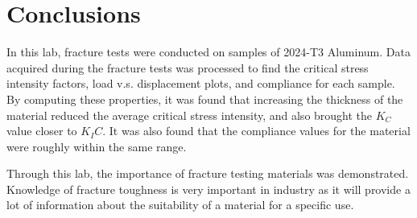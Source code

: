 \section{Conclusions}

In this lab, fracture tests were conducted on samples of 2024-T3 Aluminum. Data acquired during the fracture tests was processed to find the critical stress intensity factors, load v.s. displacement plots, and compliance for each sample. By computing these properties, it was found that increasing the thickness of the material reduced the average critical stress intensity, and also brought the $K_C$ value closer to $K_IC$. It was also found that the compliance values for the material were roughly within the same range.

Through this lab, the importance of fracture testing materials was demonstrated. Knowledge of fracture toughness is very important in industry as it will provide a lot of information about the suitability of a material for a specific use.